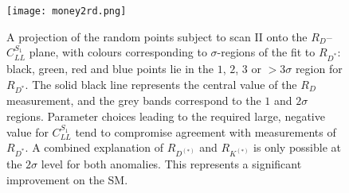 \begin{figure}[t]
    \centering \texttt{[image: money2rd.png]}
    \caption[A projection of the random points subject to scan II onto the
      $R_D$--$C_{LL}^{S_{1}}$ plane, with colours corresponding to $\sigma$-regions
      of the fit to $R_{D^*}$: black, green, red and blue points lie in the $1$,
      $2$, $3$ or $>3\sigma$ region for $R_{D^*}$.]{A projection of the random points subject to scan II onto the
      $R_D$--$C_{LL}^{S_{1}}$ plane, with colours corresponding to $\sigma$-regions
      of the fit to $R_{D^*}$: black, green, red and blue points lie in the $1$,
      $2$, $3$ or $>3\sigma$ region for $R_{D^*}$. The solid black line
      represents the central value of the $R_D$ measurement, and the grey bands
      correspond to the $1$ and $2\sigma$ regions. Parameter choices leading to
      the required large, negative value for $C_{LL}^{S_{1}}$ tend to compromise
      agreement with measurements of $R_{D^*}$. A combined explanation of
      $R_{D^{(*)}}$ and $R_{K^{(*)}}$ is only possible at the $2\sigma$ level
      for both anomalies. This represents a significant improvement on the SM.}
  \label{fig:ch3-money}
\end{figure}
